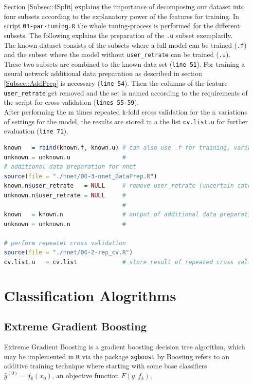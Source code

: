 \documentclass[a4paper,12pt]{article}
\begin{document}
Section \ref{Subsec::4Split} explains the importance of decomposing our dataset into four subsets according to the explanatory power of the features for training. In script \texttt{01-par-tuning.R} the whole tuning-process is performed for the different subsets. The following explains the preparation of the \texttt{.u} subset exemplarily.\\
The known dataset consists of the subsets where a full model can be trained (\texttt{.f}) and the subset where the model without \texttt{user\_retrate} can be trained (\texttt{.u}). These two subsets are combined to the known data set (\texttt{line 51}). For training a neural network additional data preparation as described in section \ref{Subsec::AddPrep} is necessary (\texttt{line 54}). Then the columns of the feature \texttt{user\_retrate} get removed and the set is named according to the requirements of the script for cross validation (\texttt{lines 55-59}). \\
After performing the m times repeated k-fold cross validation for the n variations of settings for the model, the results are stored in a the list \texttt{cv.list.u} for further evaluation (\texttt{line 71}).
\newpage
\begin{lstlisting}[language=r]
known   = rbind(known.f, known.u) # can also use .f for training, variables are pure
unknown = unknown.u               #
# additional data preparation for nnet
source(file = "./nnet/00-3-nnet_DataPrep.R")
known.n$user_retrate   = NULL     # remove user_retrate (uncertain categories)
unknown.n$user_retrate = NULL     #
                                  #
known   = known.n                 # output of additional data preparation
unknown = unknown.n               #

# perform repeatet cross validation
source(file = "./nnet/00-2-rep_cv.R")
cv.list.u   = cv.list             # store result of repeated cross validation

\end{lstlisting}



\section{Classification Alogrithms}\label{Sec::Algorit}

\subsection{Extreme Gradient Boosting}
Extreme Gradient Boosting is a gradient boosting decision tree algorithm, which may be implemented in \texttt{R} via the package \texttt{xgboost} by \citep{chen2016} Boosting refers to an additive training technique where starting with some base classifiers $\hat{y}^{(0)}= f_0(x_0)$, an objective function $F(y,f_k)$,
\end{document}
